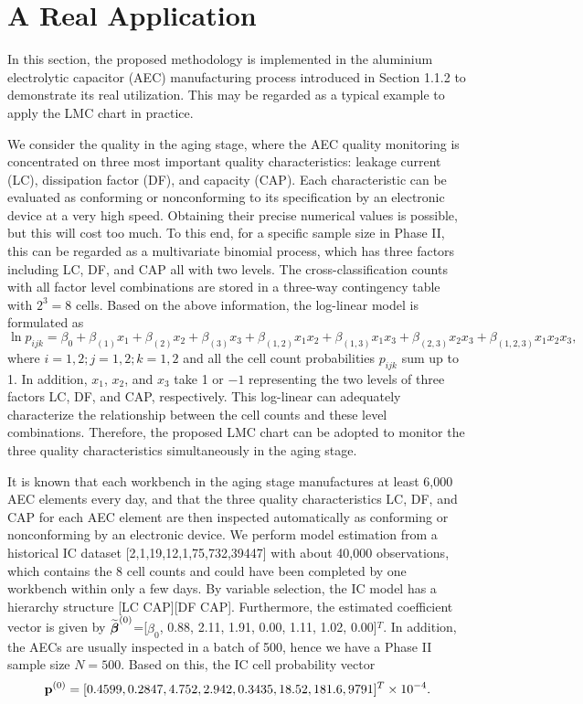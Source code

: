 \section{A Real Application}\label{sec2.5}

In this section, the proposed methodology is implemented in the aluminium
electrolytic capacitor (AEC) manufacturing process introduced in Section 1.1.2 to
demonstrate its real utilization. This may be regarded as a typical example to apply
the LMC chart in practice.

We consider the quality in the aging stage, where the AEC quality monitoring is
concentrated on three most important quality characteristics: leakage current (LC),
dissipation factor (DF), and capacity (CAP). Each characteristic can be evaluated as
conforming or nonconforming to its specification by an electronic device at a very
high speed. Obtaining their precise numerical values is possible, but this will cost
too much. To this end, for a specific sample size in Phase II, this can be regarded
as a multivariate binomial process, which has three factors including LC, DF, and
CAP all with two levels. The cross-classification counts with all factor level
combinations are stored in a three-way contingency table with $2^3=8$ cells. Based
on the above information, the log-linear model is formulated as
\[
\ln p_{ijk}=\beta_0+\beta_{(1)}x_1+\beta_{(2)}x_2+\beta_{(3)}x_3+
\beta_{(1,2)}x_1x_2+\beta_{(1,3)}x_1x_3+\beta_{(2,3)}x_2x_3+\beta_{(1,2,3)}x_1x_2x_3,
\]
where $i=1,2;j=1,2;k=1,2$ and all the cell count probabilities $p_{ijk}$ sum up to
1. In addition, $x_1$, $x_2$, and $x_3$ take 1 or $-1$ representing the two levels
of three factors LC, DF, and CAP, respectively. This log-linear can adequately
characterize the relationship between the cell counts and these level combinations.
Therefore, the proposed LMC chart can be adopted to monitor the three quality
characteristics simultaneously in the aging stage.

It is known that each workbench in the aging stage manufactures at least 6,000 AEC
elements every day, and that the three quality characteristics LC, DF, and CAP for
each AEC element are then inspected automatically as conforming or nonconforming by
an electronic device. We perform model estimation from a historical IC dataset
[2,1,19,12,1,75,732,39447] with about 40,000 observations, which contains the 8 cell
counts and could have been completed by one workbench within only a few days. By
variable selection, the IC model has a hierarchy structure [LC CAP][DF CAP].
Furthermore, the estimated coefficient vector is given by
$\widetilde{\boldsymbol\beta}^{(0)}$=[$\beta_0$, 0.88, 2.11, 1.91, 0.00, 1.11, 1.02, 0.00]$^T$. In
addition, the AECs are usually inspected in a batch of 500, hence we have a Phase II
sample size $N=500$. Based on this, the IC cell probability vector
\[
{\bf p}^{(0)}=[0.4599,0.2847,4.752,2.942,0.3435,18.52,181.6,9791]^T\times 10^{-4}.
\]

